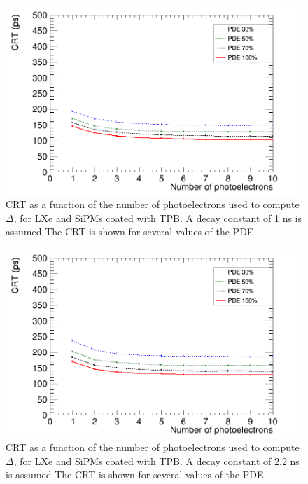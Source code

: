\documentclass[review]{elsarticle}
\begin{document}
\begin{figure}[!bhtp]
	\centering
	\includegraphics[scale=0.4]{../img/PetaloTOF/tpb_noCher_1d0ns_avg_npe_phys.png}
	\caption{\label{fig.crtTPB1ns} CRT as a function of the number of photoelectrons used to compute $\Delta$, for LXe and SiPMs coated with TPB. A decay constant of 1 ns is assumed The CRT is shown for several values of the PDE. }
\end{figure}

\begin{figure}[!bhtp]
	\centering
	\includegraphics[scale=0.4]{../img/PetaloTOF/tpb_noCher_2d2ns_avg_npe_phys.png}
	\caption{\label{fig.crtTPB2ns} CRT as a function of the number of photoelectrons used to compute $\Delta$, for LXe and SiPMs coated with TPB. A decay constant of 2.2 ns is assumed The CRT is shown for several values of the PDE. }
\end{figure}
\end{document}
